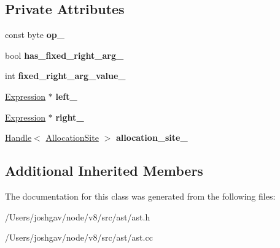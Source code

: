 \subsection*{Private Attributes}
\begin{DoxyCompactItemize}
\item 
const byte {\bfseries op\+\_\+}\hypertarget{classv8_1_1internal_1_1_binary_operation_ac3707320e07bc1ee7d61ffc5f57cbeeb}{}\label{classv8_1_1internal_1_1_binary_operation_ac3707320e07bc1ee7d61ffc5f57cbeeb}

\item 
bool {\bfseries has\+\_\+fixed\+\_\+right\+\_\+arg\+\_\+}\hypertarget{classv8_1_1internal_1_1_binary_operation_a3a73519295b5ed736214f11a7d89b864}{}\label{classv8_1_1internal_1_1_binary_operation_a3a73519295b5ed736214f11a7d89b864}

\item 
int {\bfseries fixed\+\_\+right\+\_\+arg\+\_\+value\+\_\+}\hypertarget{classv8_1_1internal_1_1_binary_operation_aeff59927a5f57ea9dbbddfed3a5a8197}{}\label{classv8_1_1internal_1_1_binary_operation_aeff59927a5f57ea9dbbddfed3a5a8197}

\item 
\hyperlink{classv8_1_1internal_1_1_expression}{Expression} $\ast$ {\bfseries left\+\_\+}\hypertarget{classv8_1_1internal_1_1_binary_operation_a1783a4d896d534636e0a68e81f06640e}{}\label{classv8_1_1internal_1_1_binary_operation_a1783a4d896d534636e0a68e81f06640e}

\item 
\hyperlink{classv8_1_1internal_1_1_expression}{Expression} $\ast$ {\bfseries right\+\_\+}\hypertarget{classv8_1_1internal_1_1_binary_operation_afedd5194da48ea79c4a90b97b8b0954e}{}\label{classv8_1_1internal_1_1_binary_operation_afedd5194da48ea79c4a90b97b8b0954e}

\item 
\hyperlink{classv8_1_1internal_1_1_handle}{Handle}$<$ \hyperlink{classv8_1_1internal_1_1_allocation_site}{Allocation\+Site} $>$ {\bfseries allocation\+\_\+site\+\_\+}\hypertarget{classv8_1_1internal_1_1_binary_operation_a1a51f09abcdad2520f79656705fd8324}{}\label{classv8_1_1internal_1_1_binary_operation_a1a51f09abcdad2520f79656705fd8324}

\end{DoxyCompactItemize}
\subsection*{Additional Inherited Members}


The documentation for this class was generated from the following files\+:\begin{DoxyCompactItemize}
\item 
/\+Users/joshgav/node/v8/src/ast/ast.\+h\item 
/\+Users/joshgav/node/v8/src/ast/ast.\+cc\end{DoxyCompactItemize}
